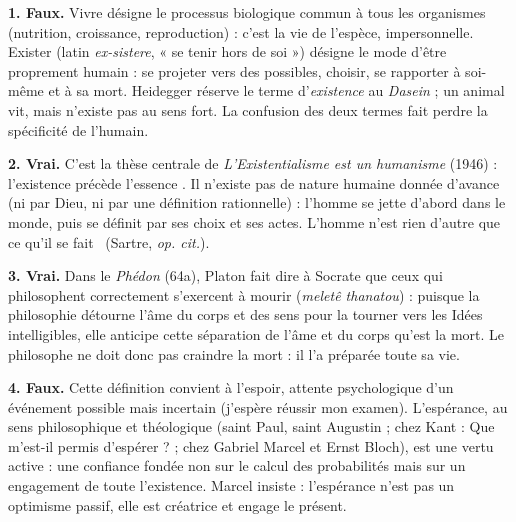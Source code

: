 \documentclass[11pt]{article}
\newcommand{\cle}[1]{{\popxbold\color{popdark}#1}}
\begin{document}
\begin{corrige}
\textbf{1. Faux.} \cle{Vivre} désigne le processus biologique commun à tous les organismes (nutrition, croissance, reproduction) : c'est la vie de l'espèce, impersonnelle. \cle{Exister} (latin \emph{ex-sistere}, « se tenir hors de soi ») désigne le mode d'être proprement humain : se projeter vers des possibles, choisir, se rapporter à soi-même et à sa mort. Heidegger réserve le terme d'\emph{existence} au \emph{Dasein} ; un animal vit, mais n'existe pas au sens fort. La confusion des deux termes fait perdre la spécificité de l'humain.

\textbf{2. Vrai.} C'est la thèse centrale de \emph{L'Existentialisme est un humanisme} (1946) : \guillemotleft l'existence précède l'essence \guillemotright. Il n'existe pas de nature humaine donnée d'avance (ni par Dieu, ni par une définition rationnelle) : l'homme se jette d'abord dans le monde, puis se définit par ses choix et ses actes. \guillemotleft L'homme n'est rien d'autre que ce qu'il se fait \guillemotright\ (Sartre, \emph{op. cit.}).

\textbf{3. Vrai.} Dans le \emph{Phédon} (64a), Platon fait dire à Socrate que ceux qui philosophent correctement s'exercent à mourir (\emph{meletê thanatou}) : puisque la philosophie détourne l'âme du corps et des sens pour la tourner vers les Idées intelligibles, elle anticipe cette séparation de l'âme et du corps qu'est la mort. Le philosophe ne doit donc pas craindre la mort : il l'a préparée toute sa vie.

\textbf{4. Faux.} Cette définition convient à l'\cle{espoir}, attente psychologique d'un événement possible mais incertain (j'espère réussir mon examen). L'\cle{espérance}, au sens philosophique et théologique (saint Paul, saint Augustin ; chez Kant : \guillemotleft Que m'est-il permis d'espérer ? \guillemotright ; chez Gabriel Marcel et Ernst Bloch), est une vertu active : une confiance fondée non sur le calcul des probabilités mais sur un engagement de toute l'existence. Marcel insiste : l'espérance n'est pas un optimisme passif, elle est créatrice et engage le présent.
\end{corrige}
\end{document}
